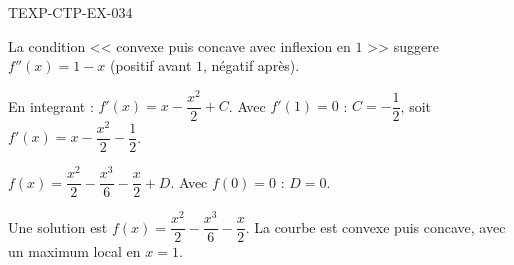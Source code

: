 \begin{corrige}{TEXP-CTP-EX-034}

La condition << convexe puis concave avec inflexion en $1$ >> suggere $f''(x) = 1 - x$ (positif avant $1$, négatif après).


En integrant : $f'(x) = x - \dfrac{x^2}{2} + C$. Avec $f'(1)=0$ : $C = -\dfrac{1}{2}$, soit $f'(x) = x - \dfrac{x^2}{2} - \dfrac{1}{2}$.

$f(x) = \dfrac{x^2}{2} - \dfrac{x^3}{6} - \dfrac{x}{2} + D$. Avec $f(0)=0$ : $D=0$.

Une solution est $\boxed{f(x) = \dfrac{x^2}{2} - \dfrac{x^3}{6} - \dfrac{x}{2}}$. La courbe est convexe puis concave, avec un maximum local en $x=1$.

\end{corrige}
